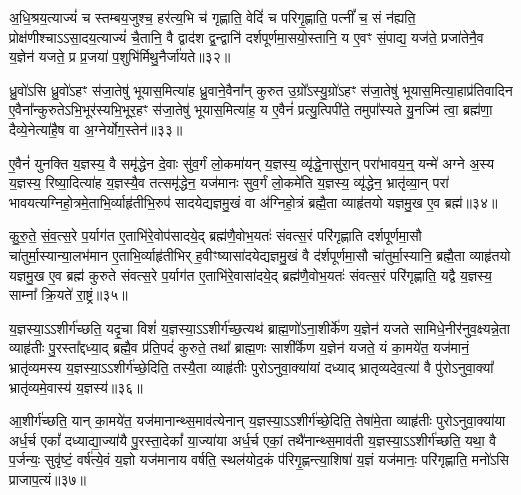 अ॒धि॒श्रय॒त्याज्यं॑ च स्तम्बय॒जुश्च॒ हर॑त्य॒भि च॑ गृह्णाति॒ वेदिं॑ च परिगृ॒ह्णाति॒ पत्नीं᳚ च॒ सं न॑ह्यति॒ प्रोक्ष॑णीश्चा\-ऽ\-ऽसा॒दय॒त्याज्यं॑ चै॒तानि॒ वै द्वाद॑श द्व॒न्द्वानि॑ दर्\mbox{}शपूर्णमा॒सयो॒स्तानि॒ य ए॒वꣳ सं॒पाद्य॒ यज॑ते॒ प्रजा॑तेनै॒व य॒ज्ञेन॑ यजते॒ प्र प्र॒जया॑ प॒शुभि॑र्मिथु॒नैर्जा॑यते॥३२॥

{\anuvakamend[{उ॒क्थ्ये॑नोपा॒प्नोत्य॑गच्छतां॒ यः पु॑रो॒डाशं॑ च चत्वारि॒ꣳ॒शच्च॑॥९॥}]}

ध्रु॒वो॑\-ऽसि ध्रु॒वो॑\-ऽहꣳ स॑जा॒तेषु॑ भूयास॒मित्या॑ह ध्रु॒वाने॒वैना᳚न् कुरुत उ॒ग्रो᳚\-ऽस्यु॒ग्रो॑\-ऽहꣳ स॑जा॒तेषु॑ भूयास॒मित्या॒हाप्र॑तिवादिन ए॒वैना᳚न्कुरुते\-ऽभि॒भूर॑स्यभि॒भूर॒हꣳ स॑जा॒तेषु॑ भूयास॒मित्या॑ह॒ य ए॒वैनं॑ प्रत्यु॒त्पिपी॑ते॒ तमुपा᳚स्यते यु॒नज्मि॑ त्वा॒ ब्रह्म॑णा॒ दैव्ये॒नेत्या॑है॒ष वा अ॒ग्नेर्योग॒स्तेन॑॥३३॥

ए॒वैनं॑ युनक्ति य॒ज्ञस्य॒ वै समृ॑द्धेन दे॒वाः सु॑व॒र्गं लो॒कमा॑यन् य॒ज्ञस्य॒ व्यृ॑द्धे॒नासु॑रा॒न् परा॑भावय॒न्॒ यन्मे॑ अग्ने अ॒स्य य॒ज्ञस्य॒ रिष्या॒दित्या॑ह य॒ज्ञस्यै॒व तत्समृ॑द्धेन॒ यज॑मानः सुव॒र्गं लो॒कमे॑ति य॒ज्ञस्य॒ व्यृ॑द्धेन॒ भ्रातृ॑व्या॒न् परा॑ भावयत्यग्निहो॒त्रमे॒ताभि॒र्व्याहृ॑तीभि॒रुप॑ सादयेद्यज्ञमु॒खं वा अ॑ग्निहो॒त्रं ब्रह्मै॒ता व्याहृ॑तयो यज्ञमु॒ख ए॒व ब्रह्म॑॥३४॥

कु॒रु॒ते॒ सं॒व॒त्स॒रे प॒र्याग॑त ए॒ताभि॑रे॒वोप॑सादये॒द् ब्रह्म॑णै॒वोभ॒यतः॑ संवत्स॒रं परि॑गृह्णाति दर्\mbox{}शपूर्णमा॒सौ चा॑तुर्मा॒स्यान्या॒लभ॑मान ए॒ताभि॒र्व्याहृ॑तीभिर्\mbox{} ह॒वीꣳष्यासा॑दयेद्यज्ञमु॒खं वै द॑र्\mbox{}शपूर्णमा॒सौ चा॑तुर्मा॒स्यानि॒ ब्रह्मै॒ता व्याहृ॑तयो यज्ञमु॒ख ए॒व ब्रह्म॑ कुरुते संवत्स॒रे प॒र्याग॑त ए॒ताभि॑रे॒वासा॑दये॒द् ब्रह्म॑णै॒वोभ॒यतः॑ संवत्स॒रं परि॑गृह्णाति॒ यद्वै य॒ज्ञस्य॒ साम्ना᳚ क्रि॒यते॑ रा॒ष्ट्रं॥३५॥

य॒ज्ञस्या॒\-ऽ\-ऽशीर्ग॑च्छति॒ यदृ॒चा विशं॑ य॒ज्ञस्या॒\-ऽ\-ऽशीर्ग॑च्छ॒त्यथ॑ ब्राह्म॒णो॑\-ऽना॒शीर्के॑ण य॒ज्ञेन॑ यजते सामिधे॒नीर॑नुव॒क्ष्यन्ने॒ता व्याहृ॑तीः पु॒रस्ता᳚द्दध्या॒द् ब्रह्मै॒व प्र॑ति॒पदं॑ कुरुते॒ तथा᳚ ब्राह्म॒णः साशी᳚र्केण य॒ज्ञेन॑ यजते॒ यं का॒मये॑त॒ यज॑मानं॒ भ्रातृ॑व्यमस्य य॒ज्ञस्या॒\-ऽ\-ऽशीर्ग॑च्छे॒दिति॒ तस्यै॒ता व्याहृ॑तीः पुरो\-ऽनुवा॒क्या॑यां दध्याद् भ्रातृव्यदेव॒त्या॑ वै पु॑रो\-ऽनुवा॒क्या᳚ भ्रातृ॑व्यमे॒वास्य॑ य॒ज्ञस्य॑॥३६॥

आ॒शीर्ग॑च्छति॒ यान् का॒मये॑त॒ यज॑मानान्थ्स॒माव॑त्येनान् य॒ज्ञस्या॒\-ऽ\-ऽशीर्ग॑च्छे॒दिति॒ तेषा॑मे॒ता व्याहृ॑तीः पुरो\-ऽनुवा॒क्या॑या अर्ध॒र्च एकां᳚ दध्याद्या॒ज्या॑यै पु॒रस्ता॒देकां᳚ या॒ज्या॑या अर्ध॒र्च एकां॒ तथै॑नान्थ्स॒माव॑ती य॒ज्ञस्या॒\-ऽ\-ऽशीर्ग॑च्छति॒ यथा॒ वै प॒र्जन्यः॒ सुवृ॑ष्टं॒ वर्\mbox{}ष॑त्ये॒वं य॒ज्ञो यज॑मानाय वर्\mbox{}षति॒ स्थल॑योद॒कं प॑रिगृ॒ह्णन्त्या॒शिषा॑ य॒ज्ञं यज॑मानः॒ परि॑गृह्णाति॒ मनो॑\-ऽसि प्राजाप॒त्यं॥३७॥

